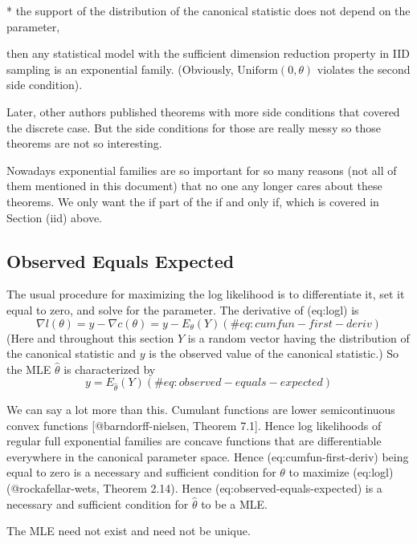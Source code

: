 \documentclass[11pt]{article}
\begin{document}
 * the support of the distribution of the canonical statistic does not
   depend on the parameter,

then any statistical model with the sufficient dimension reduction property
in IID sampling is an exponential family.
(Obviously, $\text{Uniform}(0, \theta)$ violates the second side condition).

Later, other authors published theorems with more side conditions that
covered the discrete case.  But the side conditions for those are really
messy so those theorems are not so interesting.

Nowadays exponential families are so important for so many reasons
(not all of them mentioned in this document) that no one any longer
cares about these theorems.  We only want the if part of the if and only if,
which is covered in Section \@ref(iid) above.

\subsection{Observed Equals Expected} \label{sec:observed-equals-expected}

The usual procedure for maximizing the log likelihood is to differentiate
it, set it equal to zero, and solve for the parameter.  The derivative of
\@ref(eq:logl) is
\begin{equation}
   \nabla l(\theta) = y - \nabla c(\theta)
   = y - E_\theta(Y)
   (\#eq:cumfun-first-deriv)
\end{equation}
(Here and throughout this section $Y$ is a random vector
having the distribution of the canonical statistic and $y$ is
the observed value of the canonical statistic.)
So the MLE $\hat{\theta}$ is characterized by
\begin{equation}
   y = E_{\hat{\theta}}(Y)
   (\#eq:observed-equals-expected)
\end{equation}

We can say a lot more than this.
Cumulant functions are lower semicontinuous convex functions
[@barndorff-nielsen, Theorem 7.1].  Hence log likelihoods
of regular full exponential families are concave functions
that are differentiable everywhere in the canonical parameter space.
Hence \@ref(eq:cumfun-first-deriv) being equal to zero is a necessary
and sufficient condition for $\theta$ to maximize \@ref(eq:logl)
(@rockafellar-wets, Theorem 2.14).
Hence \@ref(eq:observed-equals-expected) is a necessary and sufficient
condition for $\hat{\theta}$ to be a MLE.

The MLE need not exist and need not be unique.
\end{document}
